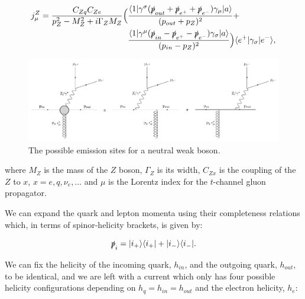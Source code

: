 		\begin{align}
		  \begin{split}
		    j^Z_\mu = \frac{C_{Zq}C_{Ze}}{p_Z^2 - M^2_Z +
		      i\Gamma_ZM_Z}\Big(&\frac{\langle 1 | \gamma^{\sigma}(\slashed p_{out} + \slashed
		        p_{e^+} + \slashed p_{e^-})\gamma_{\mu} | a \rangle}{(p_{out} + p_Z)^2} + \\
		    &\frac{\langle 1 | \gamma^{\mu}(\slashed p_{in} - \slashed p_{e^+} - \slashed
		        p_{e^-})\gamma_{\sigma} | a \rangle}{(p_{in} - p_Z)^2}\Big)\langle e^+ | \gamma_{\sigma} | e^- \rangle,
		    \label{eqn:Zcurrent}
		  \end{split}
		\end{align}

		\begin{figure}[bt]
			\includegraphics[width=0.98\linewidth]{figures/EmissionSites.pdf}
			\caption{The possible emission sites for a neutral weak boson.}
			\label{fig:emissionsites}
		\end{figure}

		where $M_Z$ is the mass of the $Z$ boson, $\Gamma_Z$ is its width, $C_{Zx}$ is
		the coupling of the $Z$ to $x$, $x=e,q,\nu_e,\ldots$ and $\mu$ is the Lorentz
		index for the $t$-channel gluon propagator.

		We can expand the quark and lepton momenta using their completeness relations which,
		in terms of spinor-helicity brackets, is given by:

		\begin{equation}
			\slashed p_{i} = |i_+\rangle\langle i_+| + |i_-\rangle\langle i_-|.
		\end{equation}

		We can fix the helicity of the incoming quark, $h_{in}$, and the outgoing quark,
		$h_{out}$, to be identical, and we are left with a current which only has four
		possible helicity configurations depending on $h_q = h_{in} = h_{out}$ and the
		electron helicity, $h_e$:

